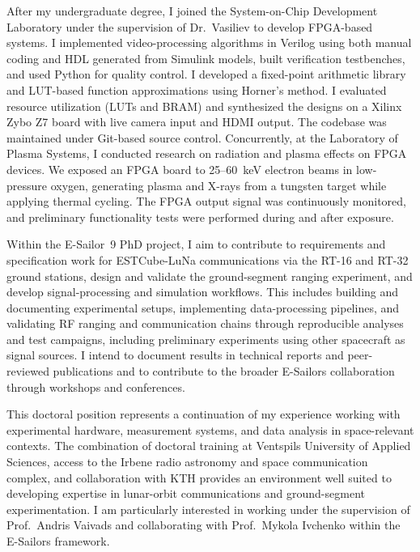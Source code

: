 \documentclass[a4paper,12pt]{article}
\begin{document}
After my undergraduate degree, I joined the System-on-Chip Development Laboratory under the supervision of Dr.\ Vasiliev to develop FPGA-based systems. I implemented video-processing algorithms in Verilog using both manual coding and HDL generated from Simulink models, built verification testbenches, and used Python for quality control. I developed a fixed-point arithmetic library and LUT-based function approximations using Horner's method. I evaluated resource utilization (LUTs and BRAM) and synthesized the designs on a Xilinx Zybo Z7 board with live camera input and HDMI output. The codebase was maintained under Git-based source control. Concurrently, at the Laboratory of Plasma Systems, I conducted research on radiation and plasma effects on FPGA devices. We exposed an FPGA board to 25--60~keV electron beams in low-pressure oxygen, generating plasma and X-rays from a tungsten target while applying thermal cycling. The FPGA output signal was continuously monitored, and preliminary functionality tests were performed during and after exposure.

Within the E-Sailor~9 PhD project, I aim to contribute to requirements and specification work for ESTCube-LuNa communications via the RT-16 and RT-32 ground stations, design and validate the ground-segment ranging experiment, and develop signal-processing and simulation workflows. This includes building and documenting experimental setups, implementing data-processing pipelines, and validating RF ranging and communication chains through reproducible analyses and test campaigns, including preliminary experiments using other spacecraft as signal sources. I intend to document results in technical reports and peer-reviewed publications and to contribute to the broader E-Sailors collaboration through workshops and conferences.

This doctoral position represents a continuation of my experience working with experimental hardware, measurement systems, and data analysis in space-relevant contexts. The combination of doctoral training at Ventspils University of Applied Sciences, access to the Irbene radio astronomy and space communication complex, and collaboration with KTH provides an environment well suited to developing expertise in lunar-orbit communications and ground-segment experimentation. I am particularly interested in working under the supervision of Prof.\ Andris Vaivads and collaborating with Prof.\ Mykola Ivchenko within the E-Sailors framework.
\end{document}
